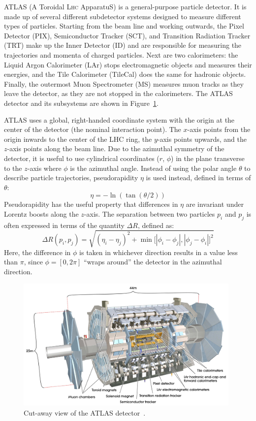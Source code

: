 ﻿ATLAS (A Toroidal L{\scshape hc} ApparatuS) is a general-purpose particle detector.
It is made up of several different subdetector systems designed to measure different types of particles.
Starting from the beam line and working outwards, the Pixel Detector (PIX), Semiconductor Tracker (SCT), and Transition Radiation Tracker (TRT) make up the Inner Detector (ID) and are responsible for measuring the trajectories and momenta of charged particles.
Next are two calorimeters: the Liquid Argon Calorimeter (LAr) stops electromagnetic objects and measures their energies, and the Tile Calorimeter (TileCal) does the same for hadronic objects.
Finally, the outermost Muon Spectrometer (MS) measures muon tracks as they leave the detector, as they are not stopped in the calorimeters.
The ATLAS detector and its subsystems are shown in Figure~\ref{fig:atlas}.

ATLAS uses a global, right-handed coordinate system with the origin at the center of the detector (the nominal interaction point).
The $x$-axis points from the origin inwards to the center of the LHC ring, the $y$-axis points upwards, and the $z$-axis points along the beam line.
Due to the azimuthal symmetry of the detector, it is useful to use cylindrical coordinates ($r$, $\phi$) in the plane transverse to the $z$-axis where $\phi$ is the azimuthal angle.
Instead of using the polar angle $\theta$ to describe particle trajectories, pseudorapidity $\eta$ is used instead, defined in terms of $\theta$:
\begin{equation}
  \eta = -\ln(\tan(\theta/2))
  \label{eq:eta}
\end{equation}
Pseudorapidity has the useful property that differences in $\eta$ are invariant under Lorentz boosts along the $z$-axis.
The separation between two particles $p_i$ and $p_j$ is often expressed in terms of the quantity $\Delta R$, defined as:
\begin{equation}
  \Delta R(p_i,p_j) = \sqrt{(\eta_i-\eta_j)^2 + \min\big[|\phi_i-\phi_j|, |\phi_j-\phi_i|\big]^2}
  \label{eq:deltar}
\end{equation}
Here, the difference in $\phi$ is taken in whichever direction results in a value less than $\pi$, since $\phi = [0,2\pi]$ ``wraps around'' the detector in the azimuthal direction.

\begin{figure}[tbp]
  \begin{center}
    \includegraphics[width=0.98\textwidth]{figs/detector/atlas.pdf}
  \end{center}
  \caption[Cut-away view of the ATLAS detector.]{Cut-away view of the ATLAS detector~\cite{PERF-2007-01}.}
  \label{fig:atlas}
\end{figure}
